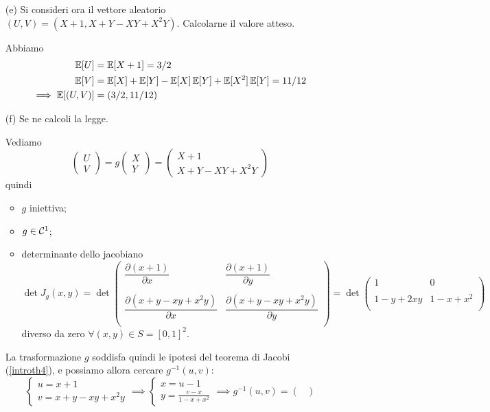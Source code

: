 \begin{enumerate}
\item [(e)] Si consideri ora il vettore aleatorio $(U,V)=(X+1,X+Y-XY+X^2Y)$. Calcolarne il valore atteso.

Abbiamo
\begin{gather*}
\begin{aligned}
\mathbb{E}[U]&=\mathbb{E}[X+1]=3/2 \\
\mathbb{E}[V]&=\mathbb{E}[X]+\mathbb{E}[Y]-\mathbb{E}[X]\,\mathbb{E}[Y]+\mathbb{E}[X^2]\,\mathbb{E}[Y]=11/12 \\
\implies \mathbb{E}[(U,V)]&=(3/2,11/12)
\end{aligned}
\end{gather*}

\item [(f)] Se ne calcoli la legge.

Vediamo
\[
\begin{pmatrix}
U \\ V
\end{pmatrix}  
=
g \begin{pmatrix}
X \\ Y
\end{pmatrix}
=
\begin{pmatrix}
X+1 \\ X+Y-XY+X^2Y
\end{pmatrix}
\]
quindi 
\begin{itemize}
\item $g$ iniettiva;
\item $g\in\mathcal{C}^1$;
\item determinante dello jacobiano
$$
\det J_g(x,y)=\det \begin{pmatrix}
\dfrac{\partial (x+1)}{\partial x} &\dfrac{\partial (x+1)}{\partial y}  \\
\, & \, \\
\dfrac{\partial (x+y-xy+x^2y)}{\partial x}   &  \dfrac{\partial (x+y-xy+x^2y)}{\partial y}  \\
\end{pmatrix}
= \det
\begin{pmatrix}
1 & 0 \\
\, &\, \\
1-y+2xy & 1-x+x^2 \\
\end{pmatrix} 
$$
diverso da zero $\forall (x,y)\in S=[0,1]^2$.
\end{itemize}
La trasformazione $g$ soddisfa quindi le ipotesi del teorema di Jacobi (\ref{introth4}), e possiamo allora cercare $g^{-1}(u,v)$:
\[
\begin{cases} u=x+1 \\ v=x+y-xy+x^2y  \end{cases}\implies \begin{cases} x=u-1 \\ y=\frac{v-x}{1-x+x^2}\end{cases}\implies g^{-1}(u,v)=\begin{pmatrix}

\end{pmatrix}\]
\end{enumerate}
